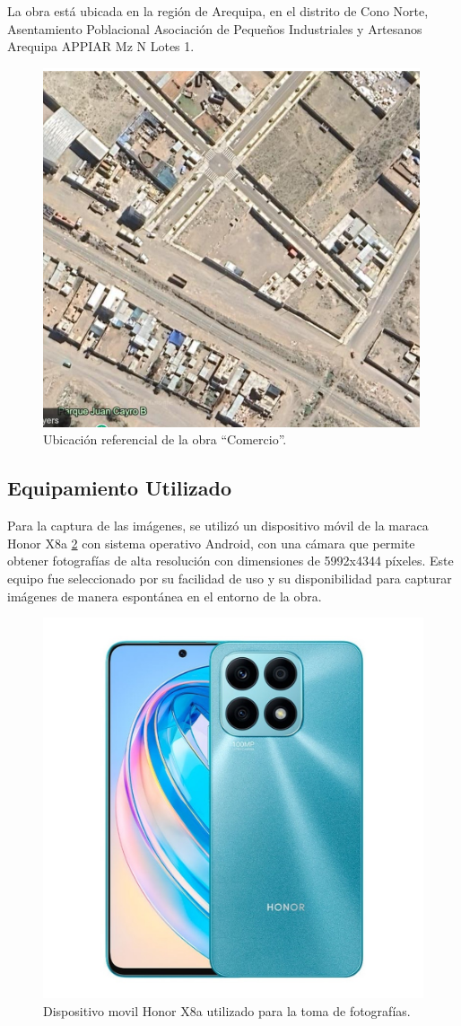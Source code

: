 La obra está ubicada en la región de Arequipa, en el distrito de Cono Norte, Asentamiento Poblacional Asociación de Pequeños Industriales y Artesanos Arequipa APPIAR Mz N Lotes 1.

\begin{figure}[!ht]
  \centering
  \includegraphics[width=.49\linewidth]{images/comercio.png}
  \caption{Ubicación referencial de la obra ``Comercio''.}
  \label{fig:comercio}
\end{figure}

\subsection{Equipamiento Utilizado}

Para la captura de las imágenes, se utilizó un dispositivo móvil de la maraca Honor X8a \ref{fig:honor} con sistema operativo Android, con una cámara que permite obtener fotografías de alta resolución con dimensiones de 5992x4344 píxeles. Este equipo fue seleccionado por su facilidad de uso y su disponibilidad para capturar imágenes de manera espontánea en el entorno de la obra.

\begin{figure}[!ht]
  \centering
  \includegraphics[width=.49\linewidth]{images/honor.jpg}
  \caption{Dispositivo movil Honor X8a utilizado para la toma de fotografías.}
  \label{fig:honor}
\end{figure}

